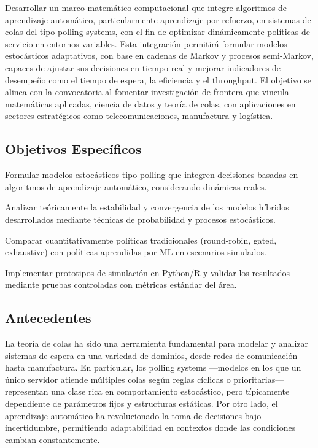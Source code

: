\documentclass[12pt]{article}
\begin{document}
Desarrollar un marco matemático-computacional que integre algoritmos de aprendizaje automático, particularmente aprendizaje por refuerzo, en sistemas de colas del tipo polling systems, con el fin de optimizar dinámicamente políticas de servicio en entornos variables. Esta integración permitirá formular modelos estocásticos adaptativos, con base en cadenas de Markov y procesos semi-Markov, capaces de ajustar sus decisiones en tiempo real y mejorar indicadores de desempeño como el tiempo de espera, la eficiencia y el throughput. El objetivo se alinea con la convocatoria al fomentar investigación de frontera que vincula matemáticas aplicadas, ciencia de datos y teoría de colas, con aplicaciones en sectores estratégicos como telecomunicaciones, manufactura y logística.

\subsection*{Objetivos Específicos}

Formular modelos estocásticos tipo polling que integren decisiones basadas en algoritmos de aprendizaje automático, considerando dinámicas reales.

Analizar teóricamente la estabilidad y convergencia de los modelos híbridos desarrollados mediante técnicas de probabilidad y procesos estocásticos.

Comparar cuantitativamente políticas tradicionales (round-robin, gated, exhaustive) con políticas aprendidas por ML en escenarios simulados.

Implementar prototipos de simulación en Python/R y validar los resultados mediante pruebas controladas con métricas estándar del área.

\subsection*{Antecedentes}

La teoría de colas ha sido una herramienta fundamental para modelar y analizar sistemas de espera en una variedad de dominios, desde redes de comunicación hasta manufactura. En particular, los polling systems —modelos en los que un único servidor atiende múltiples colas según reglas cíclicas o prioritarias— representan una clase rica en comportamiento estocástico, pero típicamente dependiente de parámetros fijos y estructuras estáticas. Por otro lado, el aprendizaje automático ha revolucionado la toma de decisiones bajo incertidumbre, permitiendo adaptabilidad en contextos donde las condiciones cambian constantemente.
\end{document}

